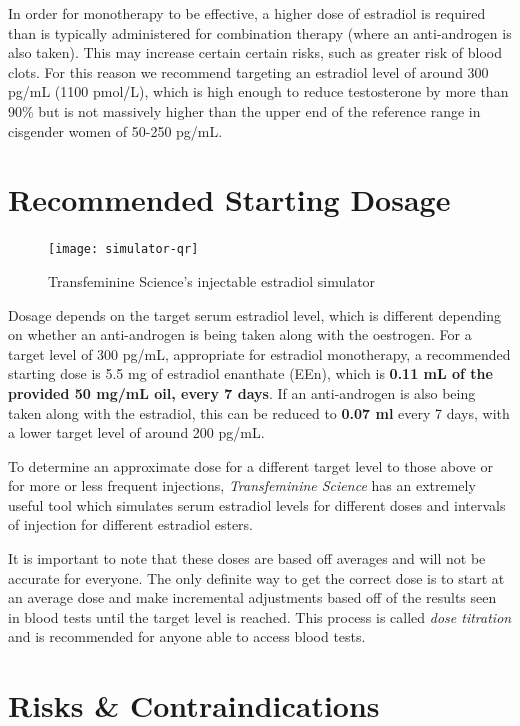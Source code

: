 \documentclass[twoside,a5paper]{article}
\begin{document}
In order for monotherapy to be effective, a higher dose of estradiol
is required than is typically administered for combination therapy
(where an anti-androgen is also taken).  This may increase certain
certain risks, such as greater risk of blood clots.  For this reason
we recommend targeting an estradiol level of around 300 pg/mL (1100
pmol/L), which is high enough to reduce testosterone by more than 90\%
but is not massively higher than the upper end of the reference range
in cisgender women of 50-250 pg/mL.

\section{Recommended Starting Dosage}

\begin{figure}
  \centering
  \texttt{[image: simulator-qr]}
  \caption{Transfeminine Science's injectable estradiol simulator}
  \label{fig:simulator-qr}
\end{figure}

Dosage depends on the target serum estradiol level, which is different
depending on whether an anti-androgen is being taken along with the
oestrogen.  For a target level of 300 pg/mL, appropriate for estradiol
monotherapy, a recommended starting dose is 5.5 mg of estradiol
enanthate (EEn), which is \textbf{0.11 mL of the provided 50 mg/mL
  oil, every 7 days}.  If an anti-androgen is also being taken along
with the estradiol, this can be reduced to \textbf{0.07 ml} every 7
days, with a lower target level of around 200 pg/mL.

To determine an approximate dose for a different target level to those
above or for more or less frequent injections, \textit{Transfeminine
  Science} has an extremely useful tool which simulates serum
estradiol levels for different doses and intervals of injection for
different estradiol esters.

It is important to note that these doses are based off averages and
will not be accurate for everyone.  The only definite way to get the
correct dose is to start at an average dose and make incremental
adjustments based off of the results seen in blood tests until the
target level is reached.  This process is called \textit{dose
  titration} and is recommended for anyone able to access blood tests.

\section{Risks \& Contraindications}
\end{document}
